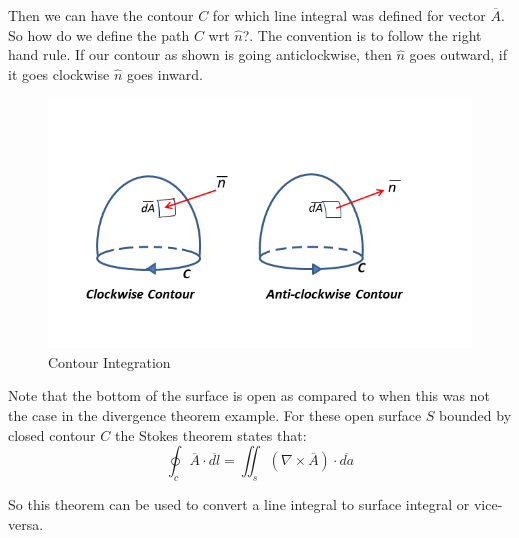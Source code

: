 Then we can have the contour $C$ for which line integral was defined for vector $\overline{A}$. So how do we define the path $C$ wrt $\hat n$?. The convention is to follow the right hand rule. If our contour as shown is going anticlockwise, then $\hat n$ goes outward, if it goes clockwise $\hat n$ goes inward.

\begin{figure}
	\centering
	\includegraphics[width=1.2\linewidth]{./graphics/contour_integral}
	\caption{Contour Integration}
\end{figure}

Note that the bottom of the surface is open as compared to when this was not the case in the divergence theorem example. For these open surface $S$ bounded by closed contour $C$ the Stokes theorem states that:
\begin{equation}
\oint_c \overline{A} \cdot \overline{dl} = \iint_s  (\nabla \times \overline{A})\cdot\overline{da}
\end{equation}

So this theorem can be used to convert a line integral to surface integral or vice-versa.

